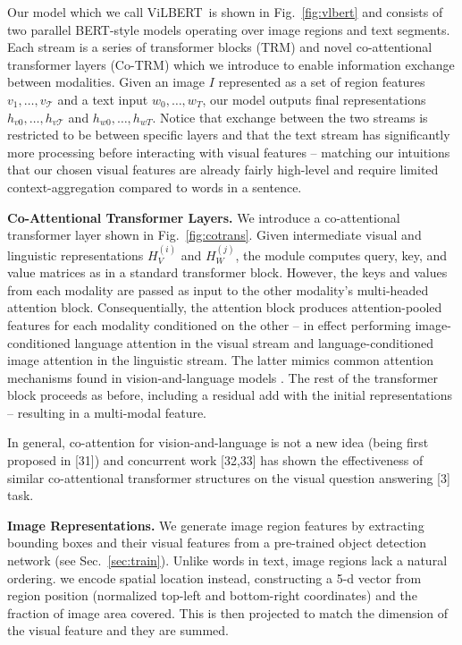 Our model which we call ViLBERT~is shown in Fig.~\ref{fig:vlbert} and consists of two parallel BERT-style models operating over image regions and text segments. Each stream is a series of transformer blocks (TRM) and novel co-attentional transformer layers (Co-TRM) which we introduce to enable information exchange between modalities. Given an image $I$ represented as a set of region features $v_1, \dots, v_\mathcal{T}$ and a text input $w_0, \dots, w_T$, our model outputs final representations $h_{v0}, \dots, h_{v\mathcal{T}}$ and $h_{w0}, \dots, h_{wT}$. Notice that exchange between the two streams is restricted to be between specific layers and that the text stream has significantly more processing before interacting with visual features -- matching our intuitions that our chosen visual features are already fairly high-level and require limited context-aggregation compared to words in a sentence. 

\textbf{Co-Attentional Transformer Layers.} We introduce a co-attentional transformer layer shown in Fig.~\ref{fig:cotrans}.
Given intermediate visual and linguistic representations $H^{(i)}_V$ and $H^{(j)}_W$, the module computes query, key, and value matrices as in a standard transformer block. However, the keys and values from each modality are passed as input to the other modality's multi-headed attention block. Consequentially, the attention block produces attention-pooled features for each modality conditioned on the other -- in effect performing image-conditioned language attention in the visual stream and language-conditioned image attention in the linguistic stream. The latter mimics common attention mechanisms found in vision-and-language models \cite{anderson2018bottom}. The rest of the transformer block proceeds as before, including a residual add with the initial representations -- resulting in a multi-modal feature. 

In general, co-attention for vision-and-language is not \textcolor{Black}{a} new idea (being first proposed in [31]) and concurrent work [32,33] has shown the effectiveness of similar co-attentional transformer structures on the visual question answering [3] task.

\textbf{Image Representations.} We generate image region features by extracting bounding boxes and their visual features from a pre-trained object detection network (see Sec.~\ref{sec:train}). Unlike words in text, image regions lack a natural ordering. we encode spatial location instead, constructing a 5-d vector from region position (normalized top-left and bottom-right coordinates) and the fraction of image area covered. This is then projected to match the dimension of the visual feature and they are summed.  

